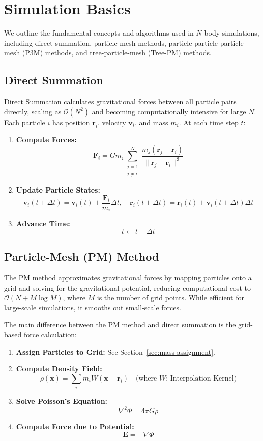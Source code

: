 \section{Simulation Basics}
We outline the fundamental concepts and algorithms used in $N$-body simulations, including direct summation, particle-mesh methods, particle-particle particle-mesh (P3M) methods, and tree-particle-mesh (Tree-PM) methods.

\subsection{Direct Summation}
Direct Summation calculates gravitational forces between all particle pairs directly, scaling as $\mathcal{O}(N^2)$ and becoming computationally intensive for large $N$. Each particle $i$ has position $\mathbf{r}_i$, velocity $\mathbf{v}_i$, and mass $m_i$. At each time step $t$:
\begin{enumerate}
    \item \textbf{Compute Forces:}
    \[
    \mathbf{F}_i = G m_i \sum_{\substack{j=1 \\ j \neq i}}^{N} \frac{m_j (\mathbf{r}_j - \mathbf{r}_i)}{\|\mathbf{r}_j - \mathbf{r}_i\|^3}
    \]
    
    \item \textbf{Update Particle States:}
    \[
    \mathbf{v}_i(t + \Delta t) = \mathbf{v}_i(t) + \frac{\mathbf{F}_i}{m_i} \Delta t, \quad \mathbf{r}_i(t + \Delta t) = \mathbf{r}_i(t) + \mathbf{v}_i(t + \Delta t) \Delta t
    \]
    
    \item \textbf{Advance Time:}
    \[
    t \leftarrow t + \Delta t
    \]
\end{enumerate}

\subsection{Particle-Mesh (PM) Method} \label{sec:pm-method}
The PM method approximates gravitational forces by mapping particles onto a grid and solving for the gravitational potential, reducing computational cost to $\mathcal{O}(N + M \log M)$, where $M$ is the number of grid points. While efficient for large-scale simulations, it smooths out small-scale forces.

The main difference between the PM method and direct summation is the grid-based force calculation:
\begin{enumerate}
    \item \textbf{Assign Particles to Grid:} See Section~\ref{sec:mass-assignment}.
    \item \textbf{Compute Density Field:}
    \[
    \rho(\mathbf{x}) = \sum_i m_i W(\mathbf{x} - \mathbf{r}_i) \quad \text{(where $W$: Interpolation Kernel)}
    \]
    \item \textbf{Solve Poisson's Equation:}
    \[
    \nabla^2 \Phi = 4\pi G \rho
    \]
    \item \textbf{Compute Force due to Potential:}
    \[
    \mathbf{E} = -\nabla \Phi
    \]
\end{enumerate}

